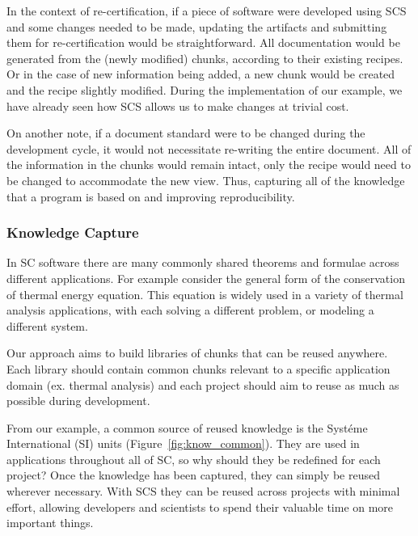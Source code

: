 \documentclass{sig-alternate-05-2015}
\newcommand{\lss}{SCS}
\begin{document}

In the context of re-certification, if a piece of software were developed using
\lss{} and some changes needed to be made, updating the artifacts and submitting
them for re-certification would be straightforward. All documentation would be
generated from the (newly modified) chunks, according to their existing recipes.
Or in the case of new information being added, a new chunk would be created and
the recipe slightly modified. During the implementation of our example, we have
already seen how \lss{} allows us to make changes at trivial cost.

On another note, if a document standard were to be changed during the
development cycle, it would not necessitate re-writing the entire document. All
of the information in the chunks would remain intact, only the recipe would need
to be changed to accommodate the new view. Thus, capturing all of the knowledge
that a program is based on and improving reproducibility.

\subsubsection{Knowledge Capture} \label{sssec:adv_knowledge}

In SC software there are many commonly shared theorems and formulae across
different applications. For example consider the general form of the
conservation of thermal energy equation. This equation is widely used in a
variety of thermal analysis applications, with each solving a different problem,
or modeling a different system.

Our approach aims to build libraries of chunks that can be reused anywhere. Each
library should contain common chunks relevant to a specific application domain
(ex. thermal analysis) and each project should aim to reuse as much as possible
during development.

From our example, a common source of reused knowledge is the Syst\'{e}me
International (SI) units (Figure~\ref{fig:know_common}). They are used in
applications throughout all of SC, so why should they be redefined for each
project? Once the knowledge has been captured, they can simply be reused
wherever necessary. With \lss{} they can be reused across projects with minimal
effort, allowing developers and scientists to spend their valuable time on more
important things.
\end{document}
